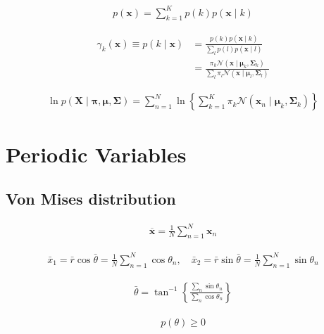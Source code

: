 \documentclass{article}
\begin{document}
\begin{align*}
p(\mathbf{x}) = \sum_{k=1}^{K} p(k) p(\mathbf{x} \mid k)
\tag{3.114}
\end{align*}

\begin{align*}
\gamma_{k}(\mathbf{x}) \equiv p(k \mid \mathbf{x}) 
& = \frac{p(k) p(\mathbf{x} \mid k)}{\sum_{l} p(l) p(\mathbf{x} \mid l)} \\
& = \frac{\pi_{k} \mathcal{N}\left(\mathbf{x} \mid \boldsymbol{\mu}_{k}, \boldsymbol{\Sigma}_{k}\right)}{\sum_{l} \pi_{l} \mathcal{N}\left(\mathbf{x} \mid \boldsymbol{\mu}_{l}, \boldsymbol{\Sigma}_{l}\right)}
\tag{3.115}
\end{align*}

\begin{align*}
\ln p(\mathbf{X} \mid \boldsymbol{\pi}, \boldsymbol{\mu}, \boldsymbol{\Sigma}) = \sum_{n=1}^{N} \ln \left\{\sum_{k=1}^{K} \pi_{k} \mathcal{N}\left(\mathbf{x}_{n} \mid \boldsymbol{\mu}_{k}, \boldsymbol{\Sigma}_{k}\right)\right\}
\tag{3.116}
\end{align*}

\section{Periodic Variables}

\subsection{Von Mises distribution}

\begin{align*}
\overline{\mathbf{x}} = \frac{1}{N} \sum_{n=1}^{N} \mathbf{x}_{n} 
\tag{3.117}
\end{align*}

\begin{align*}
\bar{x}_{1} = \bar{r} \cos \bar{\theta} = \frac{1}{N} \sum_{n=1}^{N} \cos \theta_{n}, \quad 
\bar{x}_{2} = \bar{r} \sin \bar{\theta} = \frac{1}{N} \sum_{n=1}^{N} \sin \theta_{n} 
\tag{3.118}
\end{align*}

\begin{align*}
\bar{\theta} = \tan^{-1} \left\{ \frac{\sum_{n} \sin \theta_{n}}{\sum_{n} \cos \theta_{n}} \right\} 
\tag{3.119}
\end{align*}

\begin{align*}
p(\theta) \geqslant 0  
\tag{3.120}
\end{align*}
\end{document}
